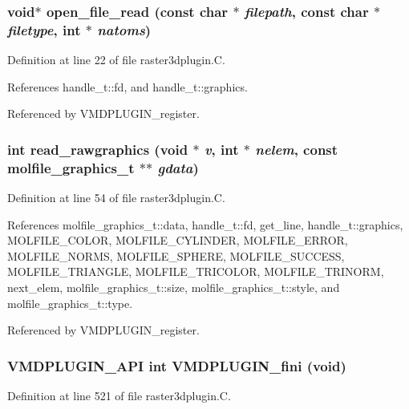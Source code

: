 \subsubsection{\setlength{\rightskip}{0pt plus 5cm}void$\ast$ open\_\-file\_\-read (const char $\ast$ {\em filepath}, const char $\ast$ {\em filetype}, int $\ast$ {\em natoms})\hspace{0.3cm}{\tt  [static]}}\label{raster3dplugin_8C_a1}




Definition at line 22 of file raster3dplugin.C.

References handle\_\-t::fd, and handle\_\-t::graphics.

Referenced by VMDPLUGIN\_\-register.
\subsubsection{\setlength{\rightskip}{0pt plus 5cm}int read\_\-rawgraphics (void $\ast$ {\em v}, int $\ast$ {\em nelem}, const {\bf molfile\_\-graphics\_\-t} $\ast$$\ast$ {\em gdata})\hspace{0.3cm}{\tt  [static]}}\label{raster3dplugin_8C_a4}




Definition at line 54 of file raster3dplugin.C.

References molfile\_\-graphics\_\-t::data, handle\_\-t::fd, get\_\-line, handle\_\-t::graphics, MOLFILE\_\-COLOR, MOLFILE\_\-CYLINDER, MOLFILE\_\-ERROR, MOLFILE\_\-NORMS, MOLFILE\_\-SPHERE, MOLFILE\_\-SUCCESS, MOLFILE\_\-TRIANGLE, MOLFILE\_\-TRICOLOR, MOLFILE\_\-TRINORM, next\_\-elem, molfile\_\-graphics\_\-t::size, molfile\_\-graphics\_\-t::style, and molfile\_\-graphics\_\-t::type.

Referenced by VMDPLUGIN\_\-register.
\subsubsection{\setlength{\rightskip}{0pt plus 5cm}VMDPLUGIN\_\-API int VMDPLUGIN\_\-fini (void)}\label{raster3dplugin_8C_a7}




Definition at line 521 of file raster3dplugin.C.

